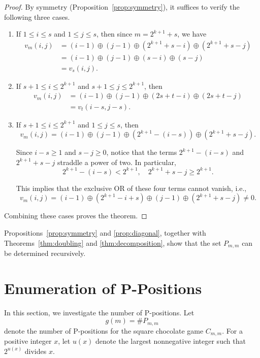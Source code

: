 \documentclass{article}
\theoremstyle{definition}
\theoremstyle{plain}
\theoremstyle{remark}
\begin{document}
\begin{proof}
By symmetry (Proposition~\ref{prop:symmetry}), it suffices to verify the following
three cases.

\begin{enumerate}
\item
If $1\le i\le s$ and $1\le j\le s$, then since $m=2^{k+1}+s$, we have
\begin{align*}
v_m(i,j)
&=(i-1)\oplus(j-1)\oplus(2^{k+1}+s-i)\oplus(2^{k+1}+s-j)\\
&=(i-1)\oplus(j-1)\oplus(s-i)\oplus(s-j)\\
&=v_s(i,j).
\end{align*}

\item
If $s+1\le i\le 2^{k+1}$ and $s+1\le j\le 2^{k+1}$, then
\begin{align*}
v_m(i,j)
&=(i-1)\oplus(j-1)\oplus(2s+t-i)\oplus(2s+t-j)\\
&=v_t(i-s,j-s).
\end{align*}

\item
If $s+1\le i\le 2^{k+1}$ and $1\le j\le s$, then
\[
v_m(i,j) = (i-1)\oplus(j-1)\oplus
(2^{k+1}-(i-s))\oplus(2^{k+1}+s-j).
\]

Since $i-s \geq 1$ and $s-j \geq 0$, notice that the terms $2^{k+1}-(i-s)$ and $2^{k+1}+s-j$ straddle a power of two. In particular,
\[
2^{k+1}-(i-s) < 2^{k+1}, \quad 2^{k+1}+s-j \geq 2^{k+1}.
\]

This implies that the exclusive OR of these four terms cannot vanish, i.e.,
\[
v_m(i,j) = (i-1)\oplus(2^{k+1}-i+s)\oplus(j-1)\oplus(2^{k+1}+s-j) \neq 0.
\]
\end{enumerate}

Combining these cases proves the theorem.
\end{proof}

Propositions~\ref{prop:symmetry} and \ref{prop:diagonal}, together with
Theorems~\ref{thm:doubling} and \ref{thm:decomposition}, show that
the set $P_{m,m}$ can be determined recursively.
\section{Enumeration of P-Positions}

In this section, we investigate the number of P-positions.
Let
\[
g(m)=\# P_{m,m}
\]
denote the number of P-positions for the square chocolate game $C_{m,m}$.
For a positive integer $x$, let $u(x)$ denote the largest nonnegative integer
such that $2^{u(x)}$ divides $x$.
\end{document}
